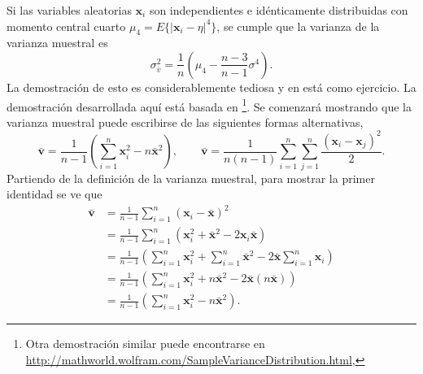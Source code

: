 \documentclass[a4paper]{report}
\newcommand{\x}{\mathbf{x}}
\begin{document}
Si las variables aleatorias \(\x_i\) son independientes e idénticamente distribuidas con momento central cuarto \(\mu_4=E\{|\x_i-\eta|^4\}\), se cumple que la varianza de la varianza muestral es
\begin{equation}\label{eq:sample_variance_variance}
 \sigma^2_{\bar{v}}=\frac{1}{n}\left(\mu_4-\frac{n-3}{n-1}\sigma^4\right).
\end{equation}
La demostración de esto es considerablemente tediosa y en \cite{papoulis2002probability} está como ejercicio. La demostración desarrollada aquí está basada en \cite{73080}\footnote{Otra demostración similar puede encontrarse en \url{http://mathworld.wolfram.com/SampleVarianceDistribution.html},}. Se comenzará mostrando que la varianza muestral puede escribirse de las siguientes formas alternativas,
\[
 \bar{\mathbf{v}}=\frac{1}{n-1}\left(\sum_{i=1}^{n}\x_i^2-n\bar{\x}^2\right),\qquad
 \bar{\mathbf{v}}=\frac{1}{n(n-1)}\sum_{i=1}^n\sum_{j=1}^n\frac{(\x_i-\x_j)^2}{2}.
\]
Partiendo de la definición de la varianza muestral, para mostrar la primer identidad se ve que
\begin{align*}
 \bar{\mathbf{v}}&=\frac{1}{n-1}\sum_{i=1}^{n}(\x_i-\bar{\x})^2\\
   &=\frac{1}{n-1}\sum_{i=1}^{n}(\x_i^2+\bar{\x}^2-2\x_i\bar{\x})\\
   &=\frac{1}{n-1}\left(\sum_{i=1}^{n}\x_i^2+\sum_{i=1}^{n}\bar{\x}^2-2\bar{\x}\sum_{i=1}^{n}\x_i\right)\\
   &=\frac{1}{n-1}\left(\sum_{i=1}^{n}\x_i^2+n\bar{\x}^2-2\bar{\x}(n\bar{\x})\right)\\
   &=\frac{1}{n-1}\left(\sum_{i=1}^{n}\x_i^2-n\bar{\x}^2\right).
\end{align*}
\end{document}
